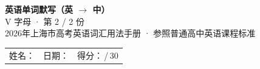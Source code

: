 \documentclass[10pt,a4paper]{article}
\begin{document}
\pagestyle{plain}

\begin{center}
{\LARGE\bfseries 英语单词默写（英 $\to$ 中）}\\[0.22em]
{\large V 字母 · 第 2 / 2 份}\\[0.18em]
{\small 2026年上海市高考英语词汇用法手册 · 参照普通高中英语课程标准}
\end{center}

\vspace{0.25em}
\noindent\begin{tabular}{@{}p{}@{}p{}@{}p{}@{}}
姓名：\underline{\hspace{2.0cm}} & 日期：\underline{\hspace{2.0cm}} & 得分：\underline{\hspace{1.3cm}}\,/\,30 \\
\end{tabular}

\vspace{0.3em}

\vspace{0.08em}
\end{document}

